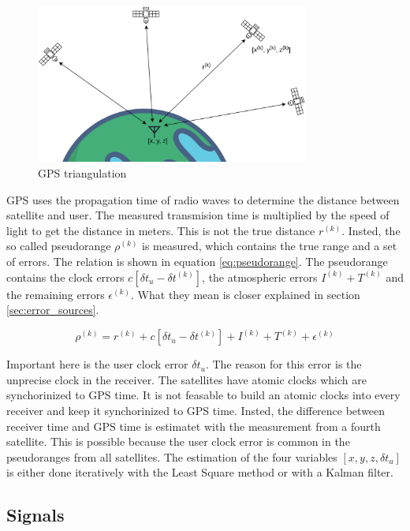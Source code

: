 \begin{figure}[ht]
 \centering
 \includegraphics[width=0.8\textwidth]{images/Position_Estimation.png}
 \caption{GPS triangulation}
 \label{fig:triangulation}
\end{figure}

GPS uses the propagation time of radio waves to determine the distance between satellite and user.
The measured transmision time is multiplied by the speed of light to get the distance in meters.
This is not the true distance $r^{(k)}$.
Insted, the so called pseudorange $\rho^{(k)}$ is measured, which contains the true range and a set of errors.
The relation is shown in equation \ref{eq:pseudorange}.
The pseudorange contains the clock errors $c[\delta t_u - \delta t^{(k)}]$, the atmospheric errors $I^{(k)} + T^{(k)}$ and the remaining errors $\epsilon^{(k)}$.
What they mean is closer explained in section \ref{sec:error_sources}.

\begin{equation}
 \rho^{(k)} = r^{(k)} + c[\delta t_u - \delta t^{(k)}] + I^{(k)} + T^{(k)} + \epsilon^{(k)}		\label{eq:pseudorange}
\end{equation}

Important here is the user clock error $\delta t_u$.
The reason for this error is the unprecise clock in the receiver.
The satellites have atomic clocks which are synchorinized to GPS time.
It is not feasable to build an atomic clocks into every receiver and keep it synchorinized to GPS time.
Insted, the difference between receiver time and GPS time is estimatet with the measurement from a fourth satellite.
This is possible because the user clock error is common in the pseudoranges from all satellites.
The estimation of the four variables $[x, y, z, \delta t_u]$ is either done iteratively with the Least Square method or with a Kalman filter.

\subsection{Signals}

